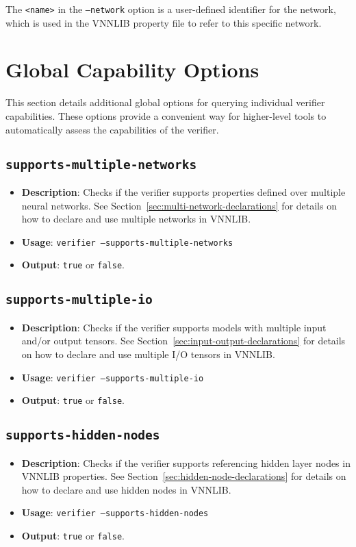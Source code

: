 The \texttt{<name>} in the \texttt{--network} option is a user-defined identifier for the network, which is used in the VNNLIB property file to refer to this specific network.

\section{Global Capability Options}
\label{sec:global_capabilities}

This section details additional global options for querying individual verifier capabilities. These options provide a convenient way for higher-level tools to automatically assess the capabilities of the verifier.

\subsection{\texttt{supports-multiple-networks}}
\begin{itemize}
    \item \textbf{Description}: Checks if the verifier supports properties defined over multiple neural networks. See Section~\ref{sec:multi-network-declarations} for details on how to declare and use multiple networks in VNNLIB.
    \item \textbf{Usage}: \texttt{verifier --supports-multiple-networks}
    \item \textbf{Output}: \texttt{true} or \texttt{false}.
\end{itemize}

\subsection{\texttt{supports-multiple-io}}
\begin{itemize}
    \item \textbf{Description}: Checks if the verifier supports models with multiple input and/or output tensors. See Section~\ref{sec:input-output-declarations} for details on how to declare and use multiple I/O tensors in VNNLIB.
    \item \textbf{Usage}: \texttt{verifier --supports-multiple-io}
    \item \textbf{Output}: \texttt{true} or \texttt{false}.
\end{itemize}

\subsection{\texttt{supports-hidden-nodes}}
\begin{itemize}
    \item \textbf{Description}: Checks if the verifier supports referencing hidden layer nodes in VNNLIB properties. See Section~\ref{sec:hidden-node-declarations} for details on how to declare and use hidden nodes in VNNLIB.
    \item \textbf{Usage}: \texttt{verifier --supports-hidden-nodes}
    \item \textbf{Output}: \texttt{true} or \texttt{false}.
\end{itemize}

